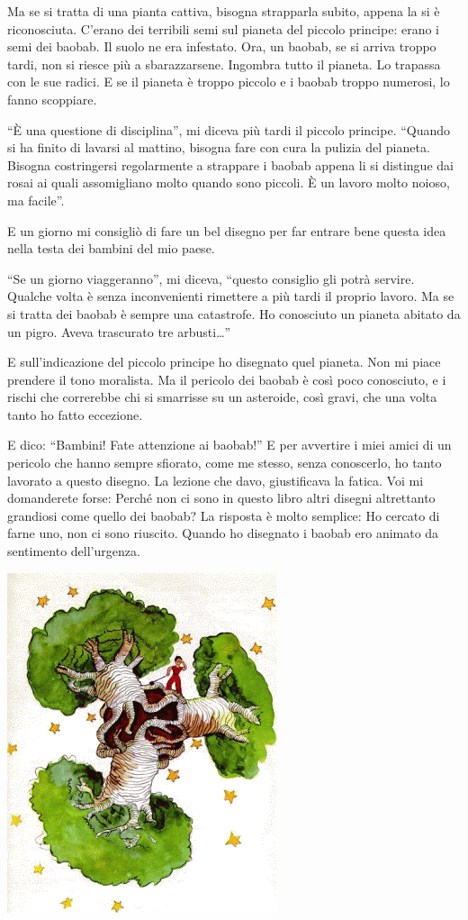 \documentclass[11pt]{scrbook}
\begin{document}
Ma se si tratta di una pianta cattiva, bisogna strapparla subito, appena la si è riconosciuta. C'erano dei terribili semi sul pianeta del piccolo principe: erano i semi dei baobab. Il suolo ne era infestato. Ora, un baobab, se si arriva troppo tardi, non si riesce più a sbarazzarsene. Ingombra tutto il pianeta. Lo trapassa con le sue radici. E se il pianeta è troppo piccolo e i baobab troppo numerosi, lo fanno scoppiare.

``È una questione di disciplina'', mi diceva più tardi il piccolo principe. ``Quando si ha finito di lavarsi al mattino, bisogna fare con cura la pulizia del pianeta. Bisogna costringersi regolarmente a strappare i baobab appena li si distingue dai rosai ai quali assomigliano molto quando sono piccoli. È un lavoro molto noioso, ma facile''.

E un giorno mi consigliò di fare un bel disegno per far entrare bene questa idea nella testa dei bambini del mio paese.

``Se un giorno viaggeranno'', mi diceva, ``questo consiglio gli potrà servire. Qualche volta è senza inconvenienti rimettere a più tardi il proprio lavoro. Ma se si tratta dei baobab è sempre una catastrofe. Ho conosciuto un pianeta abitato da un pigro. Aveva trascurato tre arbusti\ldots{}''

E sull'indicazione del piccolo principe ho disegnato quel pianeta. Non mi piace prendere il tono moralista. Ma il pericolo dei baobab è così poco conosciuto, e i rischi che correrebbe chi si smarrisse su un asteroide, così gravi, che una volta tanto ho fatto eccezione.

E dico: ``Bambini! Fate attenzione ai baobab!'' E per avvertire i miei amici di un pericolo che hanno sempre sfiorato, come me stesso, senza conoscerlo, ho tanto lavorato a questo disegno. La lezione che davo, giustificava la fatica. Voi mi domanderete forse: Perché non ci sono in questo libro altri disegni altrettanto grandiosi come quello dei baobab? La risposta è molto semplice: Ho cercato di farne uno, non ci sono riuscito. Quando ho disegnato i baobab ero animato da sentimento dell'urgenza.

\begin{center}
\includegraphics{img/baobaby}
\end{center}
\end{document}
